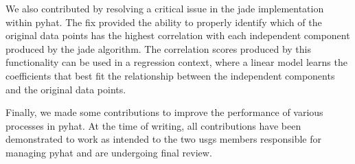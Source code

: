 We also contributed by resolving a critical issue in the \gls{jade} implementation within \gls{pyhat}.
The fix provided the ability to properly identify which of the original data points has the highest correlation with each independent component produced by the \gls{jade} algorithm.
The correlation scores produced by this functionality can be used in a regression context, where a linear model learns the coefficients that best fit the relationship between the independent components and the original data points.

Finally, we made some contributions to improve the performance of various processes in \gls{pyhat}.
At the time of writing, all contributions have been demonstrated to work as intended to the two \gls{usgs} members responsible for managing \gls{pyhat} and are undergoing final review.
